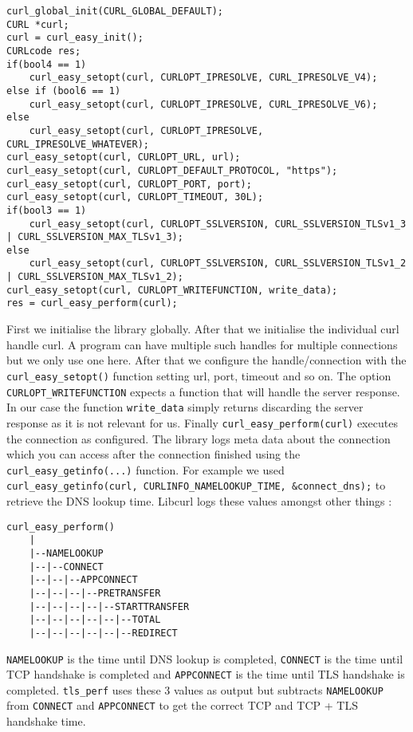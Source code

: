 \begin{lstlisting}
curl_global_init(CURL_GLOBAL_DEFAULT);
CURL *curl;
curl = curl_easy_init();
CURLcode res;
if(bool4 == 1)
	curl_easy_setopt(curl, CURLOPT_IPRESOLVE, CURL_IPRESOLVE_V4);
else if (bool6 == 1)
	curl_easy_setopt(curl, CURLOPT_IPRESOLVE, CURL_IPRESOLVE_V6);
else
	curl_easy_setopt(curl, CURLOPT_IPRESOLVE, CURL_IPRESOLVE_WHATEVER);
curl_easy_setopt(curl, CURLOPT_URL, url);
curl_easy_setopt(curl, CURLOPT_DEFAULT_PROTOCOL, "https");
curl_easy_setopt(curl, CURLOPT_PORT, port);
curl_easy_setopt(curl, CURLOPT_TIMEOUT, 30L);
if(bool3 == 1)
	curl_easy_setopt(curl, CURLOPT_SSLVERSION, CURL_SSLVERSION_TLSv1_3 
| CURL_SSLVERSION_MAX_TLSv1_3);
else
	curl_easy_setopt(curl, CURLOPT_SSLVERSION, CURL_SSLVERSION_TLSv1_2 
| CURL_SSLVERSION_MAX_TLSv1_2);
curl_easy_setopt(curl, CURLOPT_WRITEFUNCTION, write_data); 
res = curl_easy_perform(curl);
\end{lstlisting}

First we initialise the library globally. 
After that we initialise the individual curl handle curl.
A program can have multiple such handles for multiple connections but we only use one here.
After that we configure the handle/connection with the \verb|curl_easy_setopt()| function setting url, port, timeout and so on.
The option \verb|CURLOPT_WRITEFUNCTION| expects a function that will handle the server response.
In our case the function \verb|write_data| simply returns discarding the server response as it is not relevant for us.
Finally \verb|curl_easy_perform(curl)| executes the connection as configured.
The library logs meta data about the connection which you can access after the connection finished using the \verb|curl_easy_getinfo(...)| function.
For example we used \verb|curl_easy_getinfo(curl, CURLINFO_NAMELOOKUP_TIME, &connect_dns);| to retrieve the DNS lookup time.
Libcurl logs these values amongst other things \cite{Link:curl_getinfo}:
\begin{lstlisting}
curl_easy_perform()
    |
    |--NAMELOOKUP
    |--|--CONNECT
    |--|--|--APPCONNECT
    |--|--|--|--PRETRANSFER
    |--|--|--|--|--STARTTRANSFER
    |--|--|--|--|--|--TOTAL
    |--|--|--|--|--|--REDIRECT
\end{lstlisting}

\texttt{NAMELOOKUP} is the time until DNS lookup is completed, \texttt{CONNECT} is the time until TCP handshake is completed and \texttt{APPCONNECT} is the time until TLS handshake is completed.
 \texttt{tls\_perf} uses these 3 values as output but subtracts \texttt{NAMELOOKUP} from \texttt{CONNECT} and \texttt{APPCONNECT} to get the correct TCP and TCP + TLS handshake time.
 
